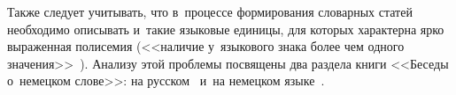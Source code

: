 \begin{multicols}{2}
    Также следует учитывать, что в~процессе формирования словарных 
статей необходимо описывать и~такие языковые единицы, для которых 
характерна ярко выраженная полисемия (<<наличие у~языкового знака более 
чем одного значения>>~\cite[с.~59]{20-gon}). Анализу этой проблемы 
посвящены два раздела книги <<Беседы о~немецком слове>>: на 
русском~\cite[с.~59--73]{20-gon} и~на немецком  
языке~\cite[с.~73--106]{20-gon}.
{ %

}

\begin{table*}[b]\small %
\vspace*{-6pt}
\begin{center}
\vspace*{2ex}


\end{center}
\end{table*}
\end{multicols}
